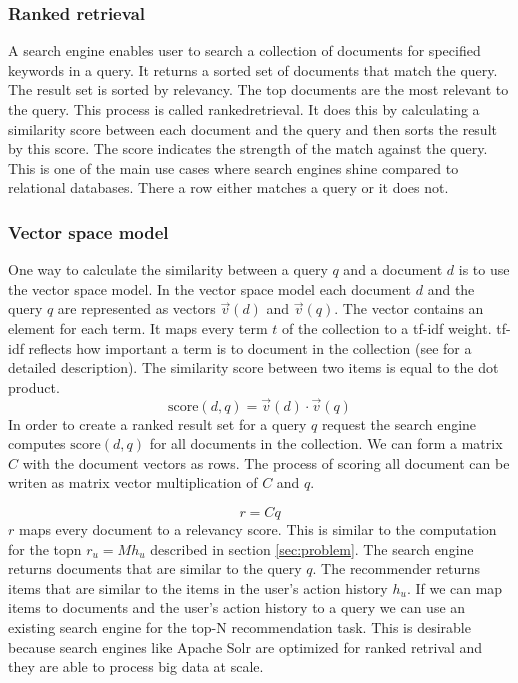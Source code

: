 \subsubsection{Ranked retrieval}
A search engine enables user to search a collection of documents for specified keywords in a query. It returns a sorted set of documents that match the query. The result set is sorted by relevancy. The top documents are the most relevant to the query. This process is called \gls{rankedretrieval}. It does this by calculating a similarity score between each document and the query and then sorts the result by this score. The score indicates the strength of the match against the query. This is one of the main use cases where search engines shine compared to relational databases. There a row either matches a query or it does not. 
\subsubsection{Vector space model}
One way to calculate the similarity between a query $q$ and a document $d$ is to use the vector space model.
In the vector space model each document $d$ and the query $q$ are represented as vectors $\vec{v}(d)$ and $\vec{v}(q)$. The vector contains an element for each term. It maps every term $t$ of the collection to a tf-idf weight. tf-idf reflects how important a term is to document in the collection (see \cite{Manning} for a detailed description). 
The similarity score between two items is equal to the dot product.
\begin{equation}
  \label{eq:score}
  \text{score}(d,q) = \vec{v}(d) \cdot \vec{v}(q)
\end{equation}
In order to create a ranked result set for a query $q$ request the search engine computes $\text{score}(d,q)$ for all documents in the collection. We can form a matrix $C$ with the document vectors as rows. The process of scoring all document can be writen as matrix vector multiplication of $C$ and $q$. 

\begin{equation}
  \label{eq:ser}
  r = C q
\end{equation}
$r$ maps every document to a relevancy score.
This is similar to the computation for the \gls{topn} $r_u = M h_u$  described in section \ref{sec:problem}. The search engine returns documents that are similar to the query $q$. The recommender returns items that are similar to the items in the user's action history $h_u$. If we can map items to documents and the user's action history to a query we can use an existing search engine for the top-N recommendation task. This is desirable because search engines like Apache Solr are optimized for ranked retrival and they are able to process big data at scale. 
